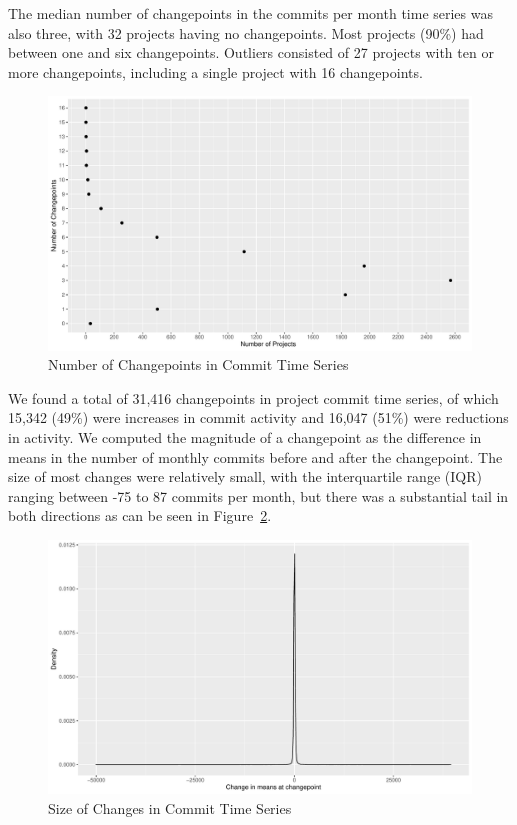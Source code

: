 \documentclass[10pt,conference]{IEEEtran}
\begin{document}
The median number of changepoints in the commits per month time series was also three, with 32 projects having no changepoints. Most projects (90\%) had between one and six changepoints. Outliers consisted of 27 projects with ten or more changepoints, including a single project with 16 changepoints.
\begin{figure}[ht!]
    \centering
    \includegraphics[width=\linewidth]{commit-changepoints.pdf}
    \caption{Number of Changepoints in Commit Time Series}
    \label{fig:commitcpts}
\end{figure}

We found a total of 31,416 changepoints in project commit time series, of which 15,342 (49\%) were increases in commit activity and 16,047 (51\%) were reductions in activity. We computed the magnitude of a changepoint as the difference in means in the number of monthly commits before and after the changepoint. The size of most changes were relatively small, with the interquartile range (IQR) ranging between -75 to 87 commits per month, but there was a substantial tail in both directions as can be seen in Figure~\ref{fig:commitsizes}.
\begin{figure}[ht!]
    \centering
    \includegraphics[width=\linewidth]{commit-changesizes.pdf}
    \caption{Size of Changes in Commit Time Series}
    \label{fig:commitsizes}
\end{figure}
\end{document}
